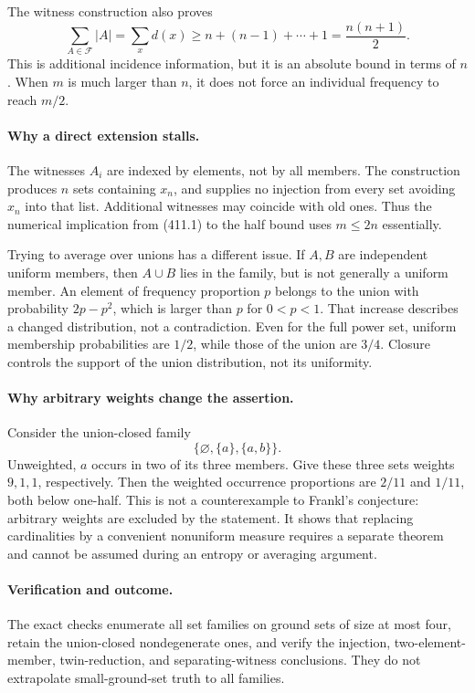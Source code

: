 \documentclass[11pt]{article}
\begin{document}
The witness construction also proves
\[
 \sum_{A\in\mathcal F}|A|
   =\sum_x d(x)\ge n+(n-1)+\cdots+1
   =\frac{n(n+1)}2.
\]
This is additional incidence information, but it is an absolute bound in terms of $n$. When $m$ is much larger than $n$, it does not force an individual frequency to reach $m/2$.

\paragraph{Why a direct extension stalls.}
The witnesses $A_i$ are indexed by elements, not by all members. The construction produces $n$ sets containing $x_n$, and supplies no injection from every set avoiding $x_n$ into that list. Additional witnesses may coincide with old ones. Thus the numerical implication from (411.1) to the half bound uses $m\le2n$ essentially.

Trying to average over unions has a different issue. If $A,B$ are independent uniform members, then $A\cup B$ lies in the family, but is not generally a uniform member. An element of frequency proportion $p$ belongs to the union with probability $2p-p^2$, which is larger than $p$ for $0<p<1$. That increase describes a changed distribution, not a contradiction. Even for the full power set, uniform membership probabilities are $1/2$, while those of the union are $3/4$. Closure controls the support of the union distribution, not its uniformity.

\paragraph{Why arbitrary weights change the assertion.}
Consider the union-closed family
\[
 \{\varnothing,\{a\},\{a,b\}\}.
\]
Unweighted, $a$ occurs in two of its three members. Give these three sets weights $9,1,1$, respectively. Then the weighted occurrence proportions are $2/11$ and $1/11$, both below one-half. This is not a counterexample to Frankl's conjecture: arbitrary weights are excluded by the statement. It shows that replacing cardinalities by a convenient nonuniform measure requires a separate theorem and cannot be assumed during an entropy or averaging argument.

\paragraph{Verification and outcome.}
The exact checks enumerate all set families on ground sets of size at most four, retain the union-closed nondegenerate ones, and verify the injection, two-element-member, twin-reduction, and separating-witness conclusions. They do not extrapolate small-ground-set truth to all families.
\end{document}
